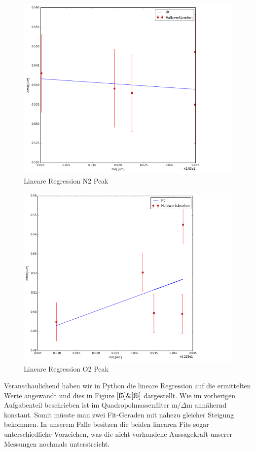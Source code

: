\documentclass[10pt,a4paper]{article}
\begin{document}
\begin{figure}[h]
	\includegraphics[scale = 0.5]{linpeak1.png}
	\centering
	\caption{Lineare Regression N2 Peak}
	\label{f5}
\end{figure}
\begin{figure}[h]
	\includegraphics[scale = 0.5]{linpeak2.png}
	\centering
	\caption{Lineare Regression O2 Peak}
	\label{f6}
\end{figure}


Veranschaulichend haben wir in Python die lineare Regression auf die ermittelten Werte angewandt und dies in Figure $\ref{f5} \& \ref{f6}$ dargestellt. Wie im vorherigen Aufgabenteil beschrieben ist im Quadropolmassenfilter m/$\Delta$m annähernd konstant. Somit müsste man zwei Fit-Geraden mit nahezu gleicher Steigung bekommen. In unserem Falle besitzen die beiden linearen Fits sogar unterschiedliche Vorzeichen, was die nicht vorhandene Aussagekraft unserer Messungen nochmals unterstreicht. 
\end{document}
